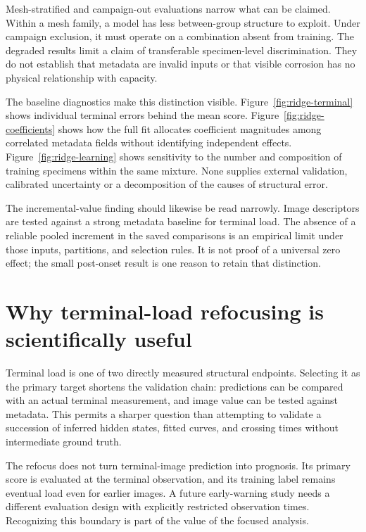 Mesh-stratified and campaign-out evaluations narrow what can be claimed. Within a mesh family, a model has less between-group structure to exploit. Under campaign exclusion, it must operate on a combination absent from training. The degraded results limit a claim of transferable specimen-level discrimination. They do not establish that metadata are invalid inputs or that visible corrosion has no physical relationship with capacity.

The baseline diagnostics make this distinction visible. Figure~\ref{fig:ridge-terminal} shows individual terminal errors behind the mean score. Figure~\ref{fig:ridge-coefficients} shows how the full fit allocates coefficient magnitudes among correlated metadata fields without identifying independent effects. Figure~\ref{fig:ridge-learning} shows sensitivity to the number and composition of training specimens within the same mixture. None supplies external validation, calibrated uncertainty or a decomposition of the causes of structural error.

The incremental-value finding should likewise be read narrowly. Image descriptors are tested against a strong metadata baseline for terminal load. The absence of a reliable pooled increment in the saved comparisons is an empirical limit under those inputs, partitions, and selection rules. It is not proof of a universal zero effect; the small post-onset result is one reason to retain that distinction.

\section{Why terminal-load refocusing is scientifically useful}
Terminal load is one of two directly measured structural endpoints. Selecting it as the primary target shortens the validation chain: predictions can be compared with an actual terminal measurement, and image value can be tested against metadata. This permits a sharper question than attempting to validate a succession of inferred hidden states, fitted curves, and crossing times without intermediate ground truth.

The refocus does not turn terminal-image prediction into prognosis. Its primary score is evaluated at the terminal observation, and its training label remains eventual load even for earlier images. A future early-warning study needs a different evaluation design with explicitly restricted observation times. Recognizing this boundary is part of the value of the focused analysis.

